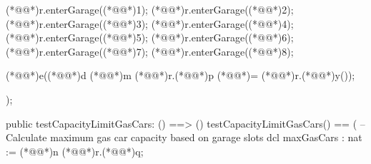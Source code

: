 \documentclass[a4paper]{article}
\begin{document}
\begin{vdm_al}
        (*@@*)r.enterGarage((*@@*)1);
        (*@@*)r.enterGarage((*@@*)2);
        (*@@*)r.enterGarage((*@@*)3);
        (*@@*)r.enterGarage((*@@*)4);
        (*@@*)r.enterGarage((*@@*)5);
        (*@@*)r.enterGarage((*@@*)6);
        (*@@*)r.enterGarage((*@@*)7);
        (*@@*)r.enterGarage((*@@*)8);
        

        (*@@*)e((*@@*)d (*@@*)m (*@@*)r.(*@@*)p (*@\vdmnotcovered{}@*)= (*@@*)r.(*@@*)y());
    
    );
    
public testCapacityLimitGasCars: () ==> ()
testCapacityLimitGasCars() ==
(   
    -- Calculate maximum gas car capacity based on garage slots
    dcl maxGasCars : nat := (*@@*)n (*@@*)r.(*@@*)q;
    

\end{vdm_al}
\end{document}
